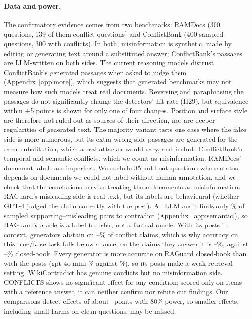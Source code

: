 \paragraph{Data and power.} The confirmatory evidence comes from two benchmarks: RAMDocs (300 questions, 139 of them
conflict questions) and ConflictBank (400 sampled questions, 300 with conflicts). In both, misinformation is
synthetic, made by editing or generating text around a substituted answer; ConflictBank's passages are LLM-written
on both sides. The current reasoning models distrust ConflictBank's generated passages when asked to judge them
(Appendix~\ref{app:more}), which suggests that generated benchmarks may not measure how such models treat real
documents. Reversing and paraphrasing the passages do not significantly change the detectors' hit rate (H29), but
equivalence within $\pm$5 points is shown for only one of four changes. Position and surface style are therefore not
ruled out as sources of their direction, nor are deeper regularities of generated text. The majority variant tests one
case where the false side is more numerous, but its extra wrong-side passages are generated for the same substitution,
which a real attacker would vary, and include ConflictBank's temporal and semantic conflicts, which we count as
misinformation. RAMDocs' document labels are imperfect. We exclude 35 hold-out questions whose status depends on
documents we could not label without human annotation, and we check that the conclusions survive treating those
documents as misinformation. RAGuard's misleading side is real text, but its labels are behavioural (whether GPT-4
judged the claim correctly with the post). An LLM audit finds only \rgAudContradict\% of sampled supporting--misleading
pairs to contradict (Appendix~\ref{app:semantic}), so RAGuard's oracle is a label transfer, not a factual oracle. With
its posts in context, generators abstain on \rgAbstMin--\rgAbstMax\% of conflict claims, which is why accuracy on this
true/false task falls below chance; on the claims they answer it is \rgAnsMin--\rgAnsMax\%, against
\rgCbMin--\rgCbMax\% closed-book. Every generator is more accurate on RAGuard closed-book than with the posts
(gpt-4o-mini \zcRgMiniConflict\% against \zpRgMiniConflict\%), so its posts make a weak retrieval setting.
WikiContradict has genuine conflicts but no misinformation side. CONFLICTS shows no significant effect for any
condition; scored only on items with a reference answer, it can neither confirm nor refute our findings. Our
comparisons detect effects of about \mdeMed\ points with 80\% power, so smaller effects, including small harms on clean
questions, may be missed.

